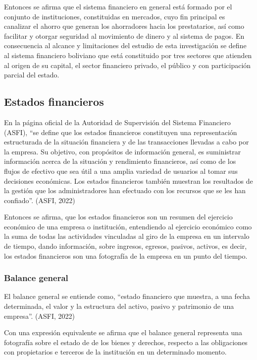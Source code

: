 \documentclass[
  12pt,
]{article}
\begin{document}
Entonces se afirma que el sistema financiero en general está formado por
el conjunto de instituciones, constituidas en mercados, cuyo fin
principal es canalizar el ahorro que generan los ahorradores hacia los
prestatarios, así como facilitar y otorgar seguridad al movimiento de
dinero y al sistema de pagos. En consecuencia al alcance y limitaciones
del estudio de esta investigación se define al sistema financiero
boliviano que está constituido por tres sectores que atienden al origen
de su capital, el sector financiero privado, el público y con
participación parcial del estado.

\hypertarget{estados-financieros}{%
\subsection{Estados financieros}\label{estados-financieros}}

En la página oficial de la Autoridad de Supervisión del Sistema
Financiero (ASFI), ``se define que los estados financieros constituyen
una representación estructurada de la situación financiera y de las
transacciones llevadas a cabo por la empresa. Su objetivo, con
propósitos de información general, es suministrar información acerca de
la situación y rendimiento financieros, así como de los flujos de
efectivo que sea útil a una amplia variedad de usuarios al tomar sus
decisiones económicas. Los estados financieros también muestran los
resultados de la gestión que los administradores han efectuado con los
recursos que se les han confiado''. (ASFI, 2022)

Entonces se afirma, que los estados financieros son un resumen del
ejercicio económico de una empresa o institución, entendiendo al
ejercicio económico como la suma de todas las actividades vinculadas al
giro de la empresa en un intervalo de tiempo, dando información, sobre
ingresos, egresos, pasivos, activos, es decir, los estados financieros
son una fotografía de la empresa en un punto del tiempo.

\hypertarget{balance-general}{%
\subsubsection{Balance general}\label{balance-general}}

El balance general se entiende como, ``estado financiero que muestra, a
una fecha determinada, el valor y la estructura del activo, pasivo y
patrimonio de una empresa''. (ASFI, 2022)

Con una expresión equivalente se afirma que el balance general
representa una fotografía sobre el estado de de los bienes y derechos,
respecto a las obligaciones con propietarios e terceros de la
institución en un determinado momento.
\end{document}
